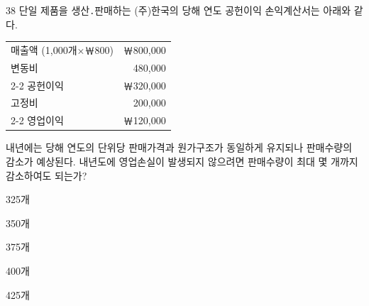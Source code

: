 \begin{question}{38}
단일 제품을 생산․판매하는 (주)한국의 당해 연도 공헌이익 손익계산서는 아래와 같다.

{\small\centering
\begin{tabular}{@{}l r@{}}
\hline
매출액 (1,000개×￦800) & ￦800,000 \\
변동비 & 480,000 \\
\cline{2-2}
공헌이익 & ￦320,000 \\
고정비 & 200,000 \\
\cline{2-2}
영업이익 & ￦120,000 \\
\hline
\end{tabular}\par}
내년에는 당해 연도의 단위당 판매가격과 원가구조가 동일하게 유지되나 판매수량의 감소가 예상된다. 내년도에 영업손실이 발생되지 않으려면 판매수량이 최대 몇 개까지 감소하여도 되는가? \par
\begin{choices}
  \item 325개
  \item 350개
  \item 375개
  \item 400개
  \item 425개
\end{choices}
\end{question}
